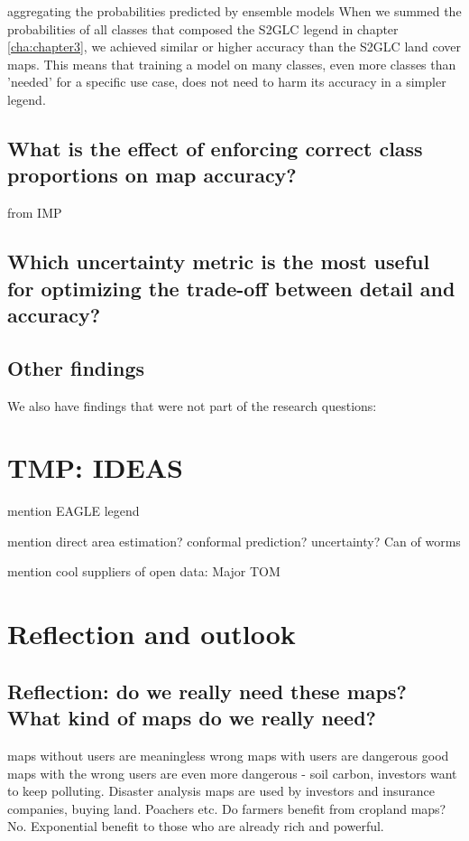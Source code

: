     aggregating the probabilities predicted by ensemble models 
    When we summed the probabilities of all classes that composed the S2GLC legend in chapter \ref{cha:chapter3}, we achieved similar or higher accuracy than the S2GLC land cover maps. This means that training a model on many classes, even more classes than 'needed' for a specific use case, does not need to harm its accuracy in a simpler legend.
    
    \subsection{What is the effect of enforcing correct class proportions on map accuracy?}
    
    from IMP
    
    \subsection{Which uncertainty metric is the most useful for optimizing the trade-off between detail and accuracy?}

    \subsection{Other findings}
    We also have findings that were not part of the research questions:

    
    
\section{TMP: IDEAS}

mention EAGLE legend

mention direct area estimation? conformal prediction? uncertainty? Can of worms

mention cool suppliers of open data:
Major TOM \citep{francis2024major}



\section{Reflection and outlook}

    \subsection{Reflection: do we really need these maps? What kind of maps do we really need?}

    maps without users are meaningless
    wrong maps with users are dangerous \citep{bastin2019global}
    good maps with the wrong users are even more dangerous - soil carbon, investors want to keep polluting. Disaster analysis maps are used by investors and insurance companies, buying land. Poachers etc. Do farmers benefit from cropland maps? No.
    Exponential benefit to those who are already rich and powerful.
    
